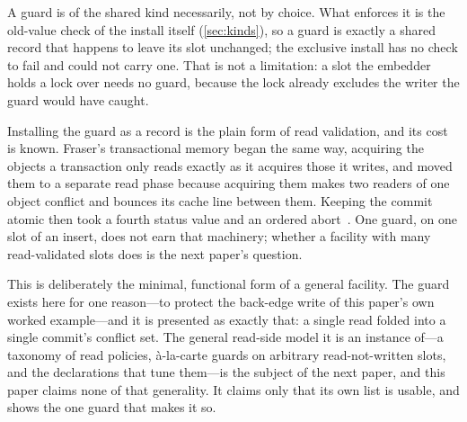 \documentclass[11pt]{article}
\begin{document}
A guard is of the shared kind necessarily, not by choice. What enforces it is the
old-value check of the install itself (\cref{sec:kinds}), so a guard is exactly a
shared record that happens to leave its slot unchanged; the exclusive install has
no check to fail and could not carry one. That is not a limitation: a slot the
embedder holds a lock over needs no guard, because the lock already excludes the
writer the guard would have caught.

Installing the guard as a record is the plain form of read validation, and its
cost is known. Fraser's transactional memory began the same way, acquiring the
objects a transaction only reads exactly as it acquires those it writes, and
moved them to a separate read phase because acquiring them makes two readers of
one object conflict and bounces its cache line between them. Keeping the commit
atomic then took a fourth status value and an ordered
abort~\citep{fraser2004lockfreedom}. One guard, on one slot of an insert, does
not earn that machinery; whether a facility with many read-validated slots does
is the next paper's question.



This is deliberately the minimal, functional form of a general facility. The
guard exists here for one reason---to protect the back-edge write of this paper's
own worked example---and it is presented as exactly that: a single
read folded into a single commit's conflict set. The general read-side model it
is an instance of---a taxonomy of read policies, à-la-carte guards on arbitrary
read-not-written slots, and the declarations that tune them---is the subject of
the next paper, and this paper claims none of that generality. It claims only
that its own list is usable, and shows the one guard that makes it so.
\end{document}
